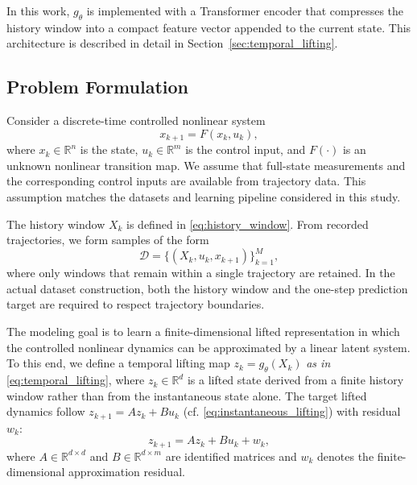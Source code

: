 \documentclass[journal]{IEEEtran}
\begin{document}
In this work, $g_\theta$ is implemented with a Transformer encoder that compresses the history window into a compact feature vector appended to the current state. This architecture is described in detail in Section~\ref{sec:temporal_lifting}.


\subsection{Problem Formulation}
\label{sec:problem}

Consider a discrete-time controlled nonlinear system
\begin{equation}
    x_{k+1} = F(x_k,u_k),
    \label{eq:nonlinear_system}
\end{equation}
where $x_k \in \mathbb{R}^n$ is the state, $u_k \in \mathbb{R}^m$ is the control input, and $F(\cdot)$ is an unknown nonlinear transition map. We assume that full-state measurements and the corresponding control inputs are available from trajectory data. This assumption matches the datasets and learning pipeline considered in this study.

The history window $X_k$ is defined in \eqref{eq:history_window}. From recorded trajectories, we form samples of the form
\begin{equation}
    \mathcal{D} = \{(X_k,u_k,x_{k+1})\}_{k=1}^{M},
    \label{eq:dataset}
\end{equation}
where only windows that remain within a single trajectory are retained. In the actual dataset construction, both the history window and the one-step prediction target are required to respect trajectory boundaries.

The modeling goal is to learn a finite-dimensional lifted representation in which the controlled nonlinear dynamics can be approximated by a linear latent system. To this end, we define a temporal lifting map $z_k = g_\theta(X_k)$ \emph{as in} \eqref{eq:temporal_lifting}, where $z_k \in \mathbb{R}^d$ is a lifted state derived from a finite history window rather than from the instantaneous state alone. The target lifted dynamics follow $z_{k+1}=Az_k+Bu_k$ (cf. \eqref{eq:instantaneous_lifting}) with residual $w_k$:
\begin{equation}
    z_{k+1} = A z_k + B u_k + w_k,
    \label{eq:lifted_dynamics}
\end{equation}
where $A \in \mathbb{R}^{d\times d}$ and $B \in \mathbb{R}^{d\times m}$ are identified matrices and $w_k$ denotes the finite-dimensional approximation residual.
\end{document}
